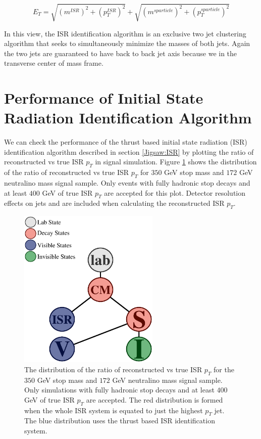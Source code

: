 \begin{equation}
\label{eqn:thrust}
E_T = \sqrt{(m^{ISR})^2+(p^{ISR}_{T})^2} + \sqrt{(m^{sparticle})^2+(p^{sparticle}_{T})^2}
\end{equation}

In this view, the ISR identification algorithm is an exclusive two jet clustering algorithm that seeks to simultaneously minimize the masses of both jets.  Again the two jets are guaranteed to have back to back jet axis because we in the transverse center of mass frame. 



\section{Performance of Initial State Radiation Identification Algorithm}
\label{Jigsaw:Performance}

We can check the performance of the thrust based initial state radiation (ISR) identification algorithm described in section \ref{Jigsaw:ISR} by plotting the ratio of reconstructed vs true ISR $p_T$ in signal simulation.  Figure \ref{fig:ISRPerformance} shows the distribution of the ratio of reconstructed vs true ISR $p_T$ for $350$ GeV stop mass and $172$ GeV neutralino mass signal sample.  Only events with fully hadronic stop decays and at least $400$ GeV of true ISR $p_T$ are accepted for this plot.  Detector resolution effects on jets and \met are included when calculating the reconstructed ISR $p_T$.

\begin{figure}[h]
\centering
\includegraphics[width=0.6\textwidth]{./figures/DecayTree.eps}
\caption{The distribution of the ratio of reconstructed vs true ISR $p_T$ for the $350$ GeV stop mass and $172$ GeV neutralino mass signal sample.  Only simulations with fully hadronic stop decays and at least $400$ GeV of true ISR $p_T$ are accepted.  The red distribution is formed when the whole ISR system is equated to just the highest $p_T$ jet.  The blue distribution uses the thrust based ISR identification system.  \label{fig:ISRPerformance}}
\end{figure}

